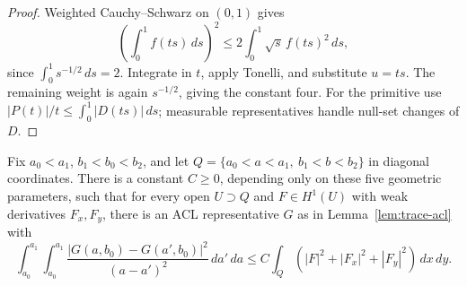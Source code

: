 \begin{proof}
\leanok
Weighted Cauchy--Schwarz on $(0,1)$ gives
\[
  \left(\int_0^1 f(ts)\,ds\right)^2
  \le 2\int_0^1 \sqrt{s}\,f(ts)^2\,ds ,
\]
since $\int_0^1s^{-1/2}\,ds=2$. Integrate in $t$, apply Tonelli,
and substitute $u=ts$. The remaining weight is again $s^{-1/2}$,
giving the constant four. For the primitive use
$|P(t)|/t\le\int_0^1|D(ts)|\,ds$; measurable representatives
handle null-set changes of $D$.
\end{proof}

\begin{lemma}
\label{lem:trace-gagliardo}
\leanok
Fix $a_0<a_1$, $b_1<b_0<b_2$, and let
$Q=\{a_0<a<a_1,\ b_1<b<b_2\}$ in diagonal coordinates.
There is a constant $C\ge0$, depending only on these five geometric
parameters, such that for every open $U\supset Q$ and $F\in H^1(U)$
with weak derivatives $F_x,F_y$, there is an ACL representative $G$ as
in Lemma~\ref{lem:trace-acl} with
\[
  \int_{a_0}^{a_1}\int_{a_0}^{a_1}
    \frac{|G(a,b_0)-G(a',b_0)|^2}{(a-a')^2}\,da'\,da
  \le C\int_Q (|F|^2+|F_x|^2+|F_y|^2)\,dx\,dy .
\]
\end{lemma}

